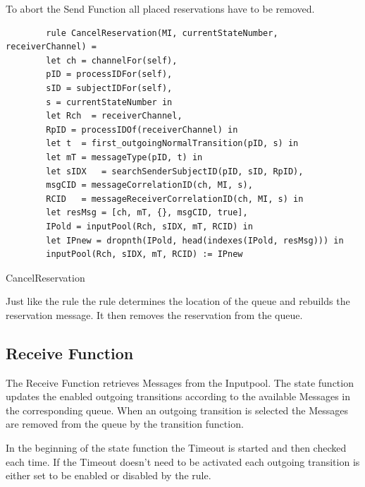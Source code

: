 To abort the Send Function all placed reservations have to be removed.

\begin{listing}[H]
	\begin{verbatim}
		rule CancelReservation(MI, currentStateNumber, receiverChannel) =
		let ch = channelFor(self),
		pID = processIDFor(self),
		sID = subjectIDFor(self),
		s = currentStateNumber in
		let Rch  = receiverChannel,
		RpID = processIDOf(receiverChannel) in
		let t  = first_outgoingNormalTransition(pID, s) in
		let mT = messageType(pID, t) in
		let sIDX   = searchSenderSubjectID(pID, sID, RpID),
		msgCID = messageCorrelationID(ch, MI, s),
		RCID   = messageReceiverCorrelationID(ch, MI, s) in
		let resMsg = [ch, mT, {}, msgCID, true],
		IPold = inputPool(Rch, sIDX, mT, RCID) in
		let IPnew = dropnth(IPold, head(indexes(IPold, resMsg))) in
		inputPool(Rch, sIDX, mT, RCID) := IPnew
	\end{verbatim}
	\caption{CancelReservation}
	\label{lst:shortasm:CancelReservation}
\end{listing}

Just like the  rule the
 rule determines the location of the queue and
rebuilds the reservation message. It then removes the reservation from the
queue.

\subsection{Receive Function}

The Receive Function retrieves Messages from the Inputpool. The state function
updates the enabled outgoing transitions according to the available Messages in
the corresponding queue. When an outgoing transition is selected the Messages
are removed from the queue by the transition function.

In the beginning of the state function the Timeout is started and then checked
each time.
If the Timeout doesn't need to be activated each outgoing transition is either set to
be enabled or disabled by the  rule.

